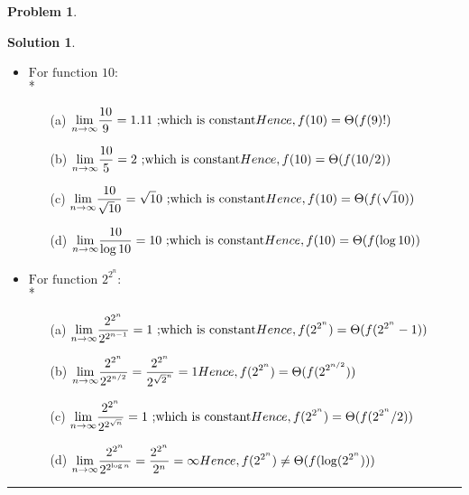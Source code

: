 \documentclass{article}
\theoremstyle{definition}
\newtheorem{problem}{Problem}
\def\fline{\rule{0.75\linewidth}{0.5pt}}
\newcommand{\finishline}{\begin{center}\fline\end{center}}
\newtheorem*{solution*}{Solution}
\newenvironment{solution}{\begin{solution*}}{{\finishline} \end{solution*}}
\begin{document}
\begin{problem}
\begin{enumerate}
\begin{solution}
\begin{itemize}
			\item ${} 10 :$\\*
			\begin{enumerate}
				 \item[(a)] $  = 1.11 {} \bigskip\\*
				 Hence, f(10) = \Theta(f(9)!)$
				\item[(b)] $  = 2 {} \bigskip\\*
				 Hence, f(10) = \Theta(f(10/2))$
				\item[(c)] $  =  {} \bigskip\\*
				 Hence, f(10) = \Theta(f())$
				\item[(d)] $  =  10 {} \bigskip\\*
				 Hence, f(10) = \Theta(f())$
		          \end{enumerate}
			\item ${} 2^{2^{n}}:$\\*
			\begin{enumerate}
				 \item[(a)] $  = 1 {} \bigskip\\*
				 Hence, f(2^{2^{n}}) = \Theta(f(2^{2^{n}}-1))$
				\item[(b)] $  =  = 1 \bigskip\\*
				 Hence, f(2^{2^{n}}) = \Theta(f(2^{2^{n/2}}))$
				\item[(c)] $  = 1  {} \bigskip\\*
				 Hence, f(2^{2^{n}}) = \Theta(f(2^{2^{n}}/2))$
				\item[(d)] $  =   = \infty \bigskip\\*
				 Hence, f(2^{2^{n}}) \neq \Theta(f(\log (2^{2^{n}})))$
		          \end{enumerate}
  	 \end{itemize}
\end{solution}

    \end{enumerate}
\end{problem}
\end{document}
